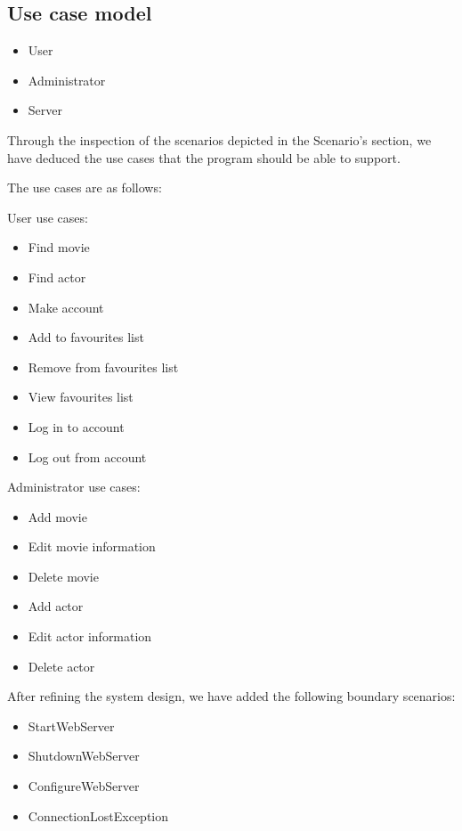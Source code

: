 \subsection{Use case model}



\begin{itemize}
	\setlength{\itemsep}{-5pt}
	\item User
	\item Administrator
	\item Server
\end{itemize}

Through the inspection of the scenarios depicted in the Scenario’s section, we have deduced the use cases that the program should be able to support.

The use cases are as follows:

User use cases:
\begin{itemize}
	\setlength{\itemsep}{-5pt}
	\item Find movie
	\item Find actor
	\item Make account
	\item Add to favourites list
	\item Remove from favourites list
	\item View favourites list
	\item Log in to account
	\item Log out from account
\end{itemize}

Administrator use cases:
\begin{itemize}
	\item Add movie
	\item Edit movie information
	\item Delete movie
	\item Add actor
	\item Edit actor information
	\item Delete actor
\end{itemize}

After refining the system design, we have added the following boundary scenarios:
\begin{itemize}
	\setlength{\itemsep}{-5pt}
	
	\item StartWebServer
	\item ShutdownWebServer
	\item ConfigureWebServer
	\item ConnectionLostException
\end{itemize}

